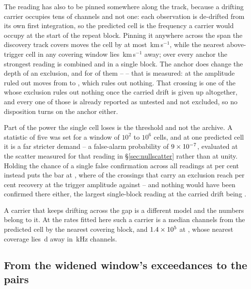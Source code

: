The reading has also to be pinned somewhere along the track, because a
drifting carrier occupies tens of channels and not one: each observation is
de-drifted from its own first integration, so the predicted cell is the
frequency a carrier would occupy at the start of the repeat block. Pinning it
anywhere across the span the discovery track covers moves the cell by at most
\AnSpanMaxKms\,km\,s$^{-1}$, while the nearest above-trigger cell in any
covering window lies \AnNearKms\,km\,s$^{-1}$ away; over every anchor the
strongest reading is \AnTBest{} combined and \AnTSingle{} in a single block.
The anchor does change the depth of an exclusion, and for \AnNMeas{} of them
-- \AnMeasStars{} -- that is measured: at \AnWorstStar{} the amplitude ruled
out moves from \AnFracFrom{} to \AnFracTo, which rules out nothing. That
crossing is one of the \AnNWideVac{} whose exclusion rules out nothing once
the carried drift is given up altogether, and every one of those is already
reported as untested and not excluded, so no disposition turns on the
anchor either.

Part of the power the single cell loses is the threshold and not the archive.
A statistic of five was set for a window of $10^{2}$ to $10^{6}$ cells, and at
one predicted cell it is a far stricter demand -- a false-alarm
probability of $9\times10^{-7}$, evaluated at the scatter
measured for that reading in \S\ref{sec:nullscatter} rather than at unity.
Holding the chance of a single false confirmation across all
\RcNRepeatMeas{} readings at \ZtFwPct{} per cent instead puts the bar at
\ZtTrialThr, where \HjNPowerTrial{} of the crossings that carry an exclusion
reach \RcPowerLevel{} per cent recovery at the trigger amplitude against
\HjNPowerHi{} -- and nothing would have been confirmed there either, the
largest single-block reading at the carried drift being \RcTMatched.

A carrier that keeps drifting across the gap is a different model and the
numbers belong to it. At the rates fitted here such a carrier is a median
\RgWalkChMed{} channels from the predicted cell by the nearest covering
block, and $1.4\times10^{5}$ at \RgWalkStar, whose
nearest coverage lies \RgWalkGapD\,d away in \RgWalkChanKHz\,kHz channels.

\subsection{From the widened window's exceedances to the pairs}
\label{sec:pairacct}

